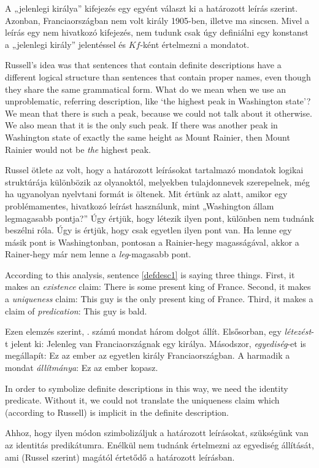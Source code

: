 A „jelenlegi királya” kifejezés egy egyént választ ki a határozott leírás szerint. Azonban, Franciaországban nem volt király 1905-ben, illetve ma sincsen. Mivel a leírás egy nem hivatkozó kifejezés, nem tudunk csak úgy definiálni egy konstanst a „jelenlegi király” jelentéssel és $Kf$-ként értelmezni a mondatot.

Russell's idea was that sentences that contain definite descriptions have a different logical structure than sentences that contain proper names, even though they share the same grammatical form. What do we mean when we use an unproblematic, referring description, like `the highest peak in Washington state'? We mean that there is such a peak, because we could not talk about it otherwise. We also mean that it is the only such peak. If there was another peak in Washington state of exactly the same height as Mount Rainier, then Mount Rainier would not be \emph{the} highest peak.

Russel ötlete az volt, hogy a határozott leírásokat tartalmazó mondatok logikai struktúrája különbözik az olyanoktól, melyekben tulajdonnevek szerepelnek, még ha ugyanolyan nyelvtani formát is öltenek. Mit értünk az alatt, amikor egy problémamentes, hivatkozó leírást használunk, mint „Washington állam legmagasabb pontja?” Úgy értjük, hogy létezik ilyen pont, különben nem tudnánk beszélni róla. Úgy is értjük, hogy csak egyetlen ilyen pont van. Ha lenne egy másik pont is Washingtonban, pontosan a Rainier-hegy magasságával, akkor a Rainer-hegy már nem lenne a  \emph{leg}-magasabb pont.

According to this analysis, sentence \ref{defdesc1} is saying three things. First, it makes an \emph{existence} claim: There is some present king of France. Second, it makes a \emph{uniqueness} claim: This guy is the only present king of France. Third, it makes a claim of \emph{predication}: This guy is bald.

Ezen elemzés szerint, . számú mondat három dolgot állít. Elsősorban, egy \emph{létezést}-t jelent ki: Jelenleg van Franciaországnak egy királya. Másodszor, \emph{egyediség}-et is megállapít: Ez az ember az egyetlen király Franciaországban. A harmadik a mondat \emph{állítmánya}: Ez az ember kopasz.

In order to symbolize definite descriptions in this way, we need the identity predicate. Without it, we could not translate the uniqueness claim which (according to Russell) is implicit in the definite description.

Ahhoz, hogy ilyen módon szimbolizáljuk a határozott leírásokat, szükségünk van az identitás predikátumra. Enélkül nem tudnánk értelmezni az egyediség állítását, ami (Russel szerint) magától értetődő a határozott leírásban.

